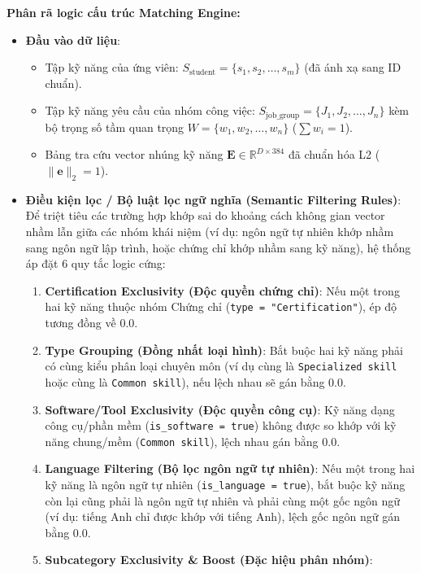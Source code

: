 \noindent
\vspace{2mm}
\textbf{Phân rã logic cấu trúc Matching Engine:}
\begin{itemize}
    \item \textbf{Đầu vào dữ liệu}:
    \begin{itemize}
        \item Tập kỹ năng của ứng viên: $S_{\text{student}} = \{s_1, s_2, \dots, s_m\}$ (đã ánh xạ sang ID chuẩn).
        \item Tập kỹ năng yêu cầu của nhóm công việc: $S_{\text{job\_group}} = \{J_1, J_2, \dots, J_n\}$ kèm bộ trọng số tầm quan trọng $W = \{w_1, w_2, \dots, w_n\}$ ($\sum w_i = 1$).
        \item Bảng tra cứu vector nhúng kỹ năng $\mathbf{E} \in \mathbb{R}^{D \times 384}$ đã chuẩn hóa L2 ($\|\mathbf{e}\|_2 = 1$).
    \end{itemize}
    \item \textbf{Điều kiện lọc / Bộ luật lọc ngữ nghĩa (Semantic Filtering Rules)}:
    Để triệt tiêu các trường hợp khớp sai do khoảng cách không gian vector nhầm lẫn giữa các nhóm khái niệm (ví dụ: ngôn ngữ tự nhiên khớp nhầm sang ngôn ngữ lập trình, hoặc chứng chỉ khớp nhầm sang kỹ năng), hệ thống áp đặt 6 quy tắc logic cứng:
    \begin{enumerate}
        \item \textbf{Certification Exclusivity (Độc quyền chứng chỉ)}: Nếu một trong hai kỹ năng thuộc nhóm Chứng chỉ (\texttt{type = "Certification"}), ép độ tương đồng về $0.0$.
        \item \textbf{Type Grouping (Đồng nhất loại hình)}: Bắt buộc hai kỹ năng phải có cùng kiểu phân loại chuyên môn (ví dụ cùng là \texttt{Specialized skill} hoặc cùng là \texttt{Common skill}), nếu lệch nhau sẽ gán bằng $0.0$.
        \item \textbf{Software/Tool Exclusivity (Độc quyền công cụ)}: Kỹ năng dạng công cụ/phần mềm (\texttt{is\_software = true}) không được so khớp với kỹ năng chung/mềm (\texttt{Common skill}), lệch nhau gán bằng $0.0$.
        \item \textbf{Language Filtering (Bộ lọc ngôn ngữ tự nhiên)}: Nếu một trong hai kỹ năng là ngôn ngữ tự nhiên (\texttt{is\_language = true}), bắt buộc kỹ năng còn lại cũng phải là ngôn ngữ tự nhiên và phải cùng một gốc ngôn ngữ (ví dụ: tiếng Anh chỉ được khớp với tiếng Anh), lệch gốc ngôn ngữ gán bằng $0.0$.
        \item \textbf{Subcategory Exclusivity \& Boost (Đặc hiệu phân nhóm)}:
        \begin{itemize}

\end{itemize}
\end{enumerate}
\end{itemize}
